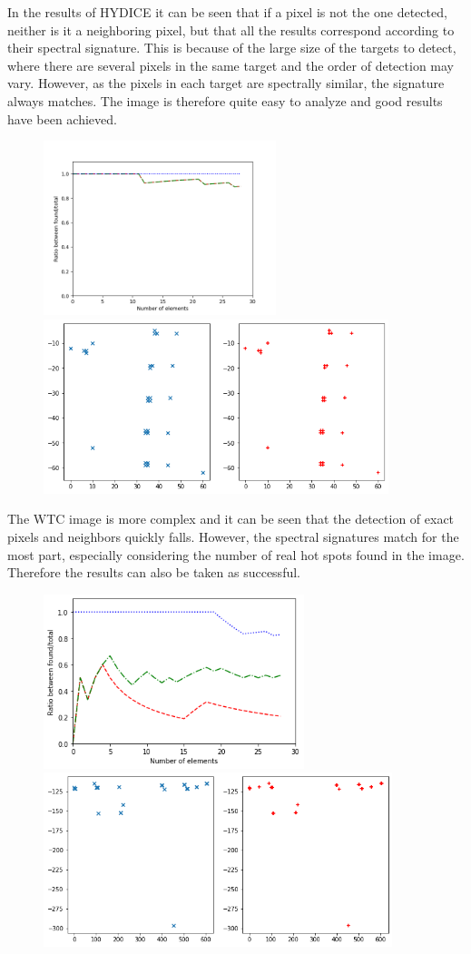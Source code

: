 In the results of HYDICE it can be seen that if a pixel is not the one detected, neither is it a neighboring pixel, but that all the results correspond according to their spectral signature. This is because of the large size of the targets to detect, where there are several pixels in the same target and the order of detection may vary. However, as the pixels in each target are spectrally similar, the signature always matches. The image is therefore quite easy to analyze and good results have been achieved.
\begin{figure}[!ht]
	\includegraphics[height=2.0in]{figures/hydice.png}
	\includegraphics[height=2.0in]{figures/hydice_res.png}
\end{figure}

The WTC image is more complex and it can be seen that the detection of exact pixels and neighbors quickly falls. However, the spectral signatures match for the most part, especially considering the number of real hot spots found in the image. Therefore the results can also be taken as successful.
\begin{figure}[!ht]
	\includegraphics[height=2.0in]{figures/wtc.png}
	\includegraphics[height=2.0in]{figures/wtc_res.png}
\end{figure}

